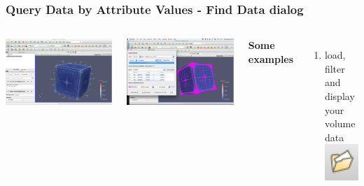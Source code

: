 \documentclass[]{beamer}
\begin{document}
\begin{frame}
\frametitle{Query Data by Attribute Values - Find Data dialog}
\begin{columns}
\begin{minipage}[c][0.4\textheight][c]{\linewidth}
  \centering
  \includegraphics[width=0.8\linewidth]{pics/GUI_elements}
\end{minipage}
\begin{minipage}[c][0.4\textheight][c]{\linewidth}
  \centering
  \includegraphics[width=0.8\linewidth]{pics/Data_selection_query.png}
\end{minipage}
\begin{minipage}[c][0.4\textheight][c]{\linewidth}
  \textbf{Some examples}
  \begin{enumerate}
  \item load, filter and display your volume data \includegraphics[width=0.07\linewidth]{pics/load_logo} ~

\end{enumerate}
\end{minipage}
\end{columns}
\end{frame}
\end{document}
